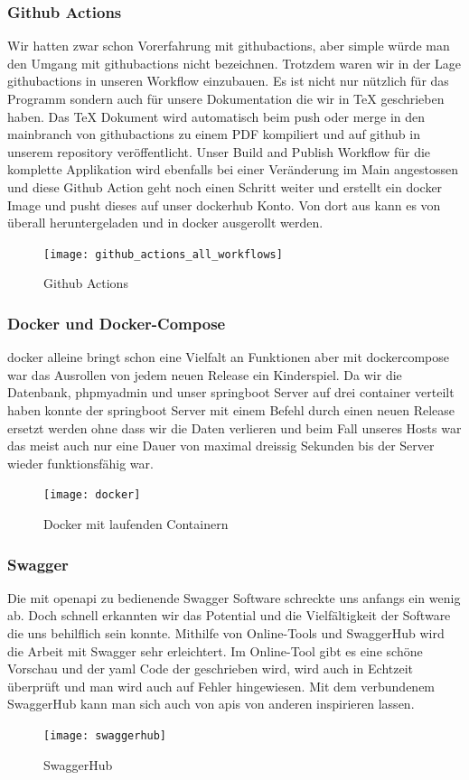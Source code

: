\documentclass[../main.tex]{subfiles}
\begin{document}
	\subsubsection{Github Actions}
	Wir hatten zwar schon Vorerfahrung mit \gls{githubactions}, aber simple würde man den Umgang mit \gls{githubactions} nicht bezeichnen. Trotzdem waren wir in der Lage \gls{githubactions} in unseren Workflow einzubauen. Es ist nicht nur nützlich für das Programm sondern auch für unsere Dokumentation die wir in TeX geschrieben haben. Das TeX Dokument wird automatisch beim \gls{push} oder \gls{merge} in den \gls{mainbranch} von \gls{githubactions} zu einem PDF kompiliert und auf \gls{github} in unserem \gls{repository} veröffentlicht. Unser Build and Publish Workflow für die komplette Applikation wird ebenfalls bei einer Veränderung im Main angestossen und diese Github Action geht noch einen Schritt weiter und erstellt ein \gls{docker} Image und pusht dieses auf unser \gls{dockerhub} Konto. Von dort aus kann es von überall heruntergeladen und in \gls{docker} ausgerollt werden.
	\begin{figure}[H]
		\centering
		\texttt{[image: github\_actions\_all\_workflows]} 
		\caption{Github Actions}
		\label{fig:github_actions_all_workflows}
	\end{figure}
	
	\subsubsection{Docker und Docker-Compose}
	\gls{docker} alleine bringt schon eine Vielfalt an Funktionen aber mit \gls{dockercompose} war das Ausrollen von jedem neuen Release ein Kinderspiel. Da wir die Datenbank, \gls{phpmyadmin} und unser \gls{springboot} Server auf drei \gls{container} verteilt haben konnte der \gls{springboot} Server mit einem Befehl durch einen neuen Release ersetzt werden ohne dass wir die Daten verlieren und beim Fall unseres Hosts war das meist auch nur eine Dauer von maximal dreissig Sekunden bis der Server wieder funktionsfähig war.
	\begin{figure}[H]
		\centering
		\texttt{[image: docker]} 
		\caption{Docker mit laufenden Containern}
		\label{fig:docker}
	\end{figure}
	
	\subsubsection{Swagger}
	Die mit \gls{openapi} zu bedienende Swagger Software schreckte uns anfangs ein wenig ab. Doch schnell erkannten wir das Potential und die Vielfältigkeit der Software die uns behilflich sein konnte. Mithilfe von Online-Tools und SwaggerHub wird die Arbeit mit Swagger sehr erleichtert. Im Online-Tool gibt es eine schöne Vorschau und der \gls{yaml} Code der geschrieben wird, wird auch in Echtzeit überprüft und man wird auch auf Fehler hingewiesen. Mit dem verbundenem SwaggerHub kann man sich auch von \gls{api}s von anderen inspirieren lassen.
		\begin{figure}[H]
		\centering
		\texttt{[image: swaggerhub]} 
		\caption{SwaggerHub}
		\label{fig:swaggerhub}
	\end{figure}
	
\end{document}
